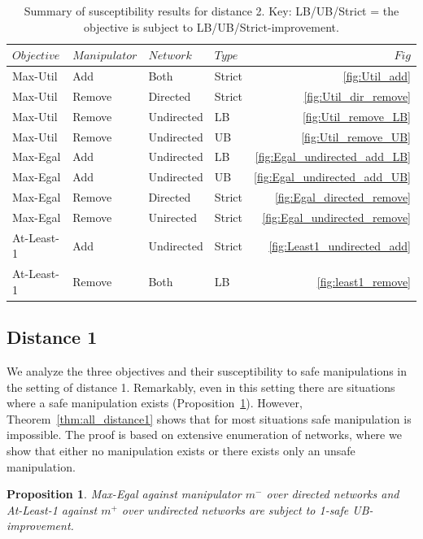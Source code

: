 \documentclass{article}
\newcommand{\ra}[1]{\renewcommand{\arraystretch}{#1}}
\newtheorem{proposition}{Proposition}
\begin{document}
{\small
\begin{table}[t]
\ra{1}
\begin{tabular}{@{}llllr@{}}\toprule 
$Objective$ & $Manipulator$ & $Network$ &  $Type$ & $Fig$\\\midrule
Max-Util & Add & Both & Strict & \ref{fig:Util_add}\\
Max-Util & Remove & Directed & Strict & \ref{fig:Util_dir_remove}\\
Max-Util & Remove & Undirected & LB & \ref{fig:Util_remove_LB}\\
Max-Util & Remove & Undirected & UB & \ref{fig:Util_remove_UB}\\
Max-Egal & Add & Undirected & LB & \ref{fig:Egal_undirected_add_LB}\\
Max-Egal & Add & Undirected & UB & \ref{fig:Egal_undirected_add_UB}\\
Max-Egal & Remove & Directed & Strict & \ref{fig:Egal_directed_remove}\\
Max-Egal & Remove & Unirected & Strict & \ref{fig:Egal_undirected_remove}\\
At-Least-1 & Add & Undirected & Strict & \ref{fig:Least1_undirected_add}\\
At-Least-1 & Remove & Both & LB & \ref{fig:least1_remove}\\
\bottomrule
\end{tabular}
\caption{Summary of susceptibility results for distance 2.
Key: LB/UB/Strict = the objective is subject to LB/UB/Strict-improvement.
}
\label{tbl:distnce2_summary}
\end{table}
}
\subsection{Distance 1}
\label{sec:distance1}
We analyze the three objectives and their susceptibility to safe manipulations in the setting of distance 1. Remarkably, even in this setting there are situations where a safe manipulation exists (Proposition~\ref{prop:distance1}). 
However, Theorem~\ref{thm:all_distance1} shows that for most situations safe manipulation is impossible. The proof is based on extensive enumeration of networks, where we show that either no manipulation exists or there exists only an unsafe manipulation.

\begin{proposition}
\label{prop:distance1}
Max-Egal against manipulator $m^-$ over directed networks and At-Least-1 against $m^+$ over undirected networks are subject to 1-safe UB-improvement.
\end{proposition}
\end{document}
